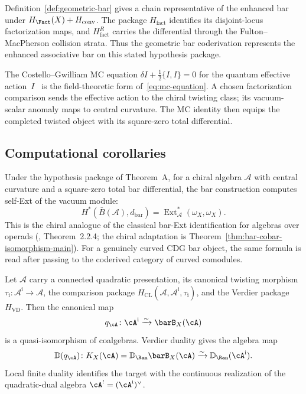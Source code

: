 Definition~\ref{def:geometric-bar} gives a chain representative of the
enhanced bar under $H_{\Fact}(X)+H_{\mathrm{conv}}$.  The package
$H_{\mathrm{fact}}$ identifies its disjoint-locus factorization maps,
and $H_{\mathrm{fact}}^{R}$ carries the differential through the
Fulton--MacPherson collision strata.  Thus the geometric bar
coderivation represents the enhanced associative bar on this stated
hypothesis package.

The Costello--Gwilliam MC equation $\delta I + \frac{1}{2}\{I,I\} = 0$
for the quantum effective action~$I$~\cite[Definition~3.2.1.1]{CG-vol2}
is the field-theoretic form of~\eqref{eq:mc-equation}.  A chosen
factorization comparison sends the effective action to the chiral
twisting class; its vacuum-scalar anomaly maps to central curvature.
The MC identity then equips the completed twisted object with its
square-zero total differential.

\subsection{Computational corollaries}

\begin{corollary}\label{cor:bar-computes-ext}
Under the hypothesis package of Theorem~A, for a chiral algebra
$\mathcal{A}$ with central curvature and a square-zero total bar differential,
the bar construction computes self-Ext of the vacuum module:
\begin{equation}
H^*(\bar{B}(\mathcal{A}), d_{\text{bar}}) =
\operatorname{Ext}_{\mathcal{A}}^*(\omega_X, \omega_X).
\end{equation}
This is the chiral analogue of the classical bar-Ext
identification for algebras over operads
\textup{(}\cite{LV12}, Theorem~2.2.4; the chiral
adaptation is Theorem~\textup{\ref{thm:bar-cobar-isomorphism-main}}\textup{)}.
For a genuinely curved CDG bar object, the same formula is read after
passing to the coderived category of curved comodules.
\end{corollary}

\begin{corollary}\label{cor:koszul-dual-cooperad}
Let $\mathcal A$ carry a connected quadratic presentation, its
canonical twisting morphism
$\tau_{\mathrm i}\colon\mathcal A^{\mathrm i}\to\mathcal A$, the
comparison package
$H_{\mathrm{CL}}(\mathcal A,\mathcal A^{\mathrm i},\tau_{\mathrm i})$,
and the Verdier package $H_{\mathrm{VD}}$.  Then the canonical map
\[
 q_\cA\colon\cA^{\mathrm i}\xrightarrow{\sim}\barB_X(\cA)
\]
is a quasi-isomorphism of coalgebras.  Verdier duality gives the
algebra map
\[
 \mathbb D(q_\cA)\colon
 K_X(\cA)=\mathbb D_{\Ran}\barB_X(\cA)
 \xrightarrow{\sim}
 \mathbb D_{\Ran}(\cA^{\mathrm i}).
\]
Local finite duality identifies the target with the continuous
realization of the quadratic-dual algebra
$\cA^!=(\cA^{\mathrm i})^\vee$.
\end{corollary}

